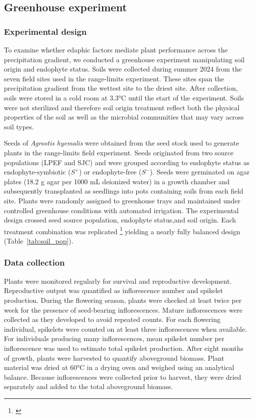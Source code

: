 \documentclass[12pt]{article}\usepackage[]{graphicx}\usepackage[dvipsnames]{xcolor}
\newcommand{\tom}[2]{{\color{red}{#1}}\footnote{\textit{\color{red}{#2}}}}
\begin{document}
{\subsection*{Greenhouse experiment}

\subsubsection*{Experimental design}

To examine whether edaphic factors mediate plant performance across the precipitation gradient, we conducted a greenhouse experiment
manipulating soil origin and endophyte status.
Soils were collected during summer 2024 from the seven field sites used in the range‐limits experiment.
These sites span the precipitation gradient from the wettest site to the driest site. 
After collection, soils were stored in a cold room at 3.3°C until the start of the experiment. 
Soils were not sterilized and therefore soil origin treatment reflect both the physical properties of the soil as well as the microbial communities that may vary across soil types.

Seeds of \textit{Agrostis hyemalis} were obtained from the seed stock used to generate plants in the range-limits field experiment. 
Seeds originated from two source populations (LPEF and SJC) and were grouped according to endophyte status as endophyte-symbiotic ($S^{+}$) or endophyte-free ($S^{-}$).
Seeds were germinated on agar plates (18.2 g agar per 1000 mL deionized water) in a growth chamber and subsequently transplanted as seedlings
into pots containing soils from each field site. 
Plants were randomly assigned to greenhouse trays and maintained under controlled greenhouse conditions with automated irrigation.
The experimental design crossed seed source population, endophyte status,and soil origin. 
Each treatment combination was replicated \tom{seven times,}{I don't think we actually reached 7 reps for most treatments because of mortality or poor germination, so I would report the realized sample sizes in the table.}
yielding a nearly fully balanced design (Table~\ref{tab:soil_pop}).

\subsubsection*{Data collection}

Plants were monitored regularly for survival and reproductive development. 
Reproductive output was quantified as inflorescence number and spikelet production. 
During the flowering season, plants were checked at least twice per week for the presence of seed-bearing inflorescences. 
Mature inflorescences were collected as they developed to avoid repeated counts. 
For each flowering individual, spikelets were counted on at least three inflorescences when available.
For individuals producing many inflorescences, mean spikelet number per inflorescence was used to estimate total spikelet production.
After eight months of growth, plants were harvested to quantify aboveground biomass. 
Plant material was dried at 60°C in a drying oven and weighed using an analytical balance. 
Because inflorescences were collected prior to harvest, they were dried separately and added to the total aboveground biomass.


}
\end{document}
